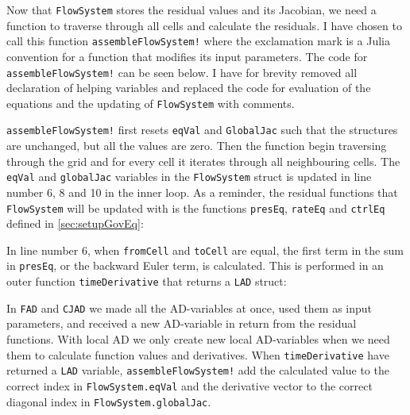 Now that \texttt{FlowSystem} stores the residual values and its Jacobian, we need a function to traverse through all cells and calculate the residuals.  I have chosen to call this function \texttt{assembleFlowSystem!} where the exclamation mark is a Julia convention for a function that modifies its input parameters. The code for \texttt{assembleFlowSystem!} can be seen below. I have for brevity removed all declaration of helping variables and replaced the code for evaluation of the equations and the updating of \texttt{FlowSystem} with comments.
\lstset{numbers=left}

\lstset{numbers=none}
\texttt{assembleFlowSystem!} first resets \texttt{eqVal} and \texttt{GlobalJac} such that the structures are unchanged, but all the values are zero. Then the function begin traversing through the grid and for every cell it iterates through all neighbouring cells. The \texttt{eqVal} and \texttt{globalJac} variables in the \texttt{FlowSystem} struct is updated in line number 6, 8 and 10 in the inner loop. As a reminder, the residual functions that \texttt{FlowSystem} will be updated with is the functions \texttt{presEq}, \texttt{rateEq} and \texttt{ctrlEq} defined in \autoref{sec:setupGovEq}:

In line number 6, when \texttt{fromCell} and \texttt{toCell} are equal, the first term in the sum in \texttt{presEq}, or the backward Euler term, is calculated. This is performed in an outer function \texttt{timeDerivative} that returns a \texttt{LAD} struct:

In \texttt{FAD} and \texttt{CJAD} we made all the AD-variables at once, used them as input parameters, and received a new AD-variable in return from the residual functions. With local AD we only create new local AD-variables when we need them to calculate function values and derivatives. When \texttt{timeDerivative} have returned a \texttt{LAD} variable, \texttt{assembleFlowSystem!} add the calculated value to the correct index in \texttt{FlowSystem.eqVal} and the derivative vector to the correct diagonal index in \texttt{FlowSystem.globalJac}.

